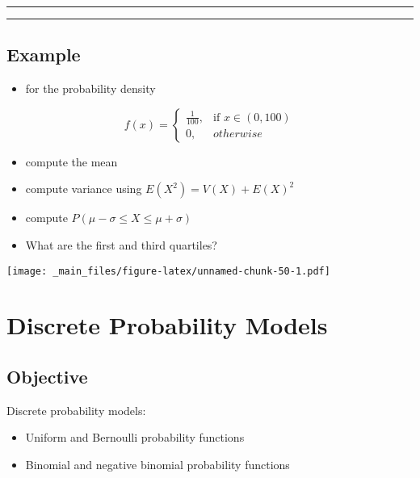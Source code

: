 \documentclass[
]{book}
\providecommand{\tightlist}{%
  \setlength{\itemsep}{0pt}\setlength{\parskip}{0pt}}
\begin{document}
\begin{center}\rule{0.5\linewidth}{0.5pt}\end{center}

\begin{center}\rule{0.5\linewidth}{0.5pt}\end{center}

\hypertarget{example-8}{%
\section{Example}\label{example-8}}

\begin{itemize}
\tightlist
\item
  for the probability density
\end{itemize}

\[
    f(x)= 
\begin{cases}
    \frac{1}{100},& \text{if } x\in (0,100)\\
    0,& otherwise 
\end{cases}
\]

\begin{itemize}
\tightlist
\item
  compute the mean
\item
  compute variance using \(E(X^2)=V(X)+E(X)^2\)
\item
  compute \(P(\mu-\sigma\leq X \leq \mu+\sigma)\)
\item
  What are the first and third quartiles?
\end{itemize}

\texttt{[image: \_main\_files/figure-latex/unnamed-chunk-50-1.pdf]}

\hypertarget{discrete-probability-models}{%
\chapter{Discrete Probability Models}\label{discrete-probability-models}}

\hypertarget{objective-5}{%
\section{Objective}\label{objective-5}}

Discrete probability models:

\begin{itemize}
\tightlist
\item
  Uniform and Bernoulli probability functions
\item
  Binomial and negative binomial probability functions
\end{itemize}
\end{document}
